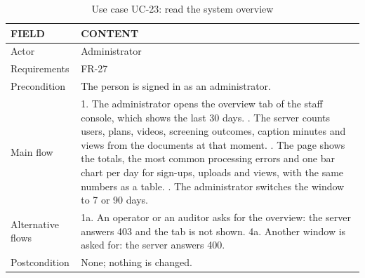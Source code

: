 \begin{table}[H]
\centering
\caption{Use case UC-23: read the system overview}
\label{tab:uc-overview}
\small
\begin{tabularx}{\textwidth}{p{} X}
\toprule
\textbf{FIELD} & \textbf{CONTENT} \\
\midrule
Actor & Administrator \\
Requirements & FR-27 \\
Precondition & The person is signed in as an administrator. \\
Main flow &
  1. The administrator opens the overview tab of the staff console, which shows the last 30 days. \newline
  2. The server counts users, plans, videos, screening outcomes, caption minutes and views from the documents at that moment. \newline
  3. The page shows the totals, the most common processing errors and one bar chart per day for sign-ups, uploads and views, with the same numbers as a table. \newline
  4. The administrator switches the window to 7 or 90 days. \\
Alternative flows &
  1a. An operator or an auditor asks for the overview: the server answers 403 and the tab is not shown. \newline
  4a. Another window is asked for: the server answers 400. \\
Postcondition & None; nothing is changed. \\
\bottomrule
\end{tabularx}
\end{table}

